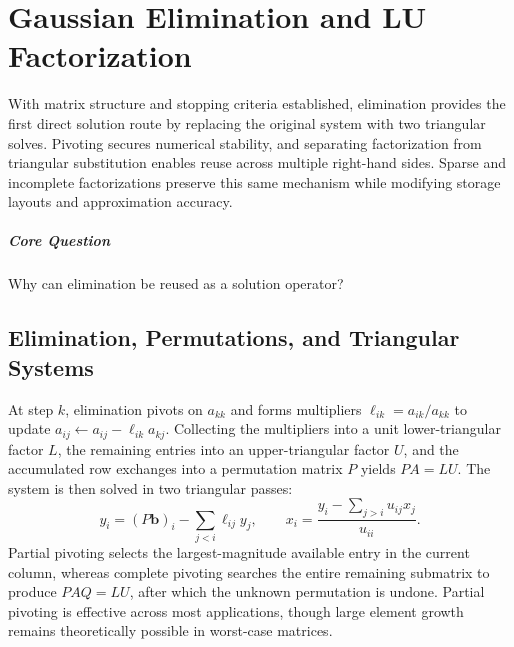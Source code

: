 \chapter{Gaussian Elimination and LU Factorization}\label{v0ch:4}
\begin{chaptersummary}
With matrix structure and stopping criteria established, elimination provides the first direct solution route by replacing the original system with two triangular solves. Pivoting secures numerical stability, and separating factorization from triangular substitution enables reuse across multiple right-hand sides. Sparse and incomplete factorizations preserve this same mechanism while modifying storage layouts and approximation accuracy.
\end{chaptersummary}
\paragraph{Core Question}Why can elimination be reused as a solution operator?

\section{Elimination, Permutations, and Triangular Systems}
At step $k$, elimination pivots on $a_{kk}$ and forms multipliers $\ell_{ik}=a_{ik}/a_{kk}$ to update $a_{ij}\leftarrow a_{ij}-\ell_{ik}a_{kj}$. Collecting the multipliers into a unit lower-triangular factor $L$, the remaining entries into an upper-triangular factor $U$, and the accumulated row exchanges into a permutation matrix $P$ yields $PA=LU$. The system is then solved in two triangular passes:
\[
 y_i=(P\bm b)_i-\sum_{j<i}\ell_{ij}y_j,\qquad
 x_i=\frac{y_i-\sum_{j>i}u_{ij}x_j}{u_{ii}}.
\]
Partial pivoting selects the largest-magnitude available entry in the current column, whereas complete pivoting searches the entire remaining submatrix to produce $PAQ=LU$, after which the unknown permutation is undone. Partial pivoting is effective across most applications, though large element growth remains theoretically possible in worst-case matrices.
